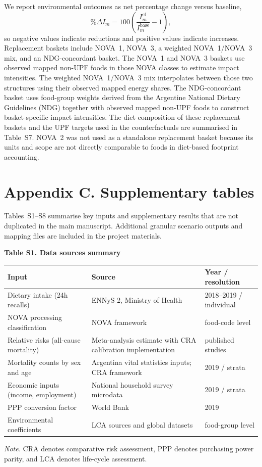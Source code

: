 ﻿\documentclass{article}
\newcommand{\manualtablecaption}[1]{%
  \par\centering\textbf{#1}\par\vspace{0.4em}%
}
\newcommand{\tabnote}[1]{%
  \vspace{0.06cm}%
  {\footnotesize\setstretch{1}\par\raggedright\textit{Note.} #1\par}%
}
\newcommand{\appsection}[1]{%
  \section*{#1}%
  \addcontentsline{toc}{section}{#1}%
}
\begin{document}
We report environmental outcomes as net percentage change versus baseline,
\[
\%\Delta I_{m}=100\left(\frac{I^{\mathrm{cf}}_{m}}{I^{\mathrm{base}}_{m}}-1\right),
\]
so negative values indicate reductions and positive values indicate increases. Replacement baskets include NOVA~1, NOVA~3, a weighted NOVA~1/NOVA~3 mix, and an NDG-concordant basket. The NOVA~1 and NOVA~3 baskets use observed mapped non-UPF foods in those NOVA classes to estimate impact intensities. The weighted NOVA~1/NOVA~3 mix interpolates between those two structures using their observed mapped energy shares. The NDG-concordant basket uses food-group weights derived from the Argentine National Dietary Guidelines (NDG) together with observed mapped non-UPF foods to construct basket-specific impact intensities. The diet composition of these replacement baskets and the UPF targets used in the counterfactuals are summarised in Table~S7. NOVA~2 was not used as a standalone replacement basket because its units and scope are not directly comparable to foods in diet-based footprint accounting. \citep{NDG2016}


\appsection{Appendix C. Supplementary tables}
Tables~S1--S8 summarise key inputs and supplementary results that are not duplicated in the main manuscript. Additional granular scenario outputs and mapping files are included in the project materials.

\vspace{0.8em}
\begin{table}[!htbp]
\centering
\manualtablecaption{Table S1. Data sources summary}
\begin{tabular}{p{5.1cm}p{6.8cm}p{3.4cm}}
\toprule
\textbf{Input} & \textbf{Source} & \textbf{Year / resolution}\\
\midrule
Dietary intake (24h recalls) & ENNyS 2, Ministry of Health \citep{ENNYS22019} & 2018--2019 / individual\\
NOVA processing classification & NOVA framework \citep{Monteiro2019UPFIdentify} & food-code level\\
Relative risks (all-cause mortality) & Meta-analysis estimate with CRA calibration implementation \citep{Pagliai2021,Nilson2023} & published studies\\
Mortality counts by sex and age & Argentina vital statistics inputs; CRA framework \citep{DEIS2019,WHO2024MethodsGBD,Nilson2023} & 2019 / strata\\
Economic inputs (income, employment) & National household survey microdata \citep{INDECEPH2019Q4} & 2019 / strata\\
PPP conversion factor & World Bank \citep{WorldBankPPP2019} & 2019\\
Environmental coefficients & LCA sources and global datasets \citep{Arrieta2022SustainSci,PooreNemecek2018,OWIDDatasets2026,ADEMEAgribalyse2026} & food-group level\\
\bottomrule
\end{tabular}
\tabnote{CRA denotes comparative risk assessment, PPP denotes purchasing power parity, and LCA denotes life-cycle assessment.}
\end{table}
\end{document}
